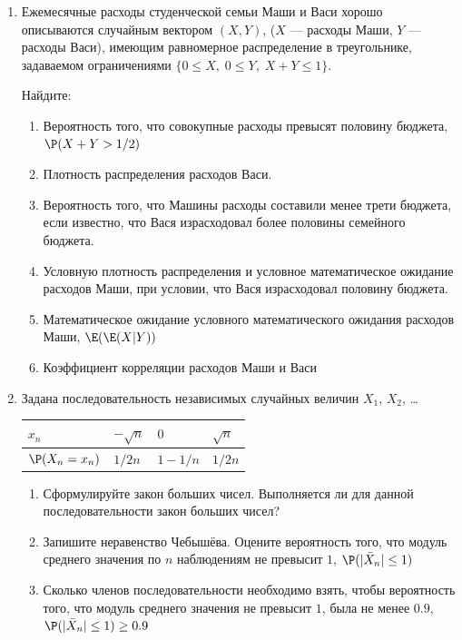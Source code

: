 \begin{enumerate}
\item Ежемесячные расходы студенческой семьи Маши и Васи хорошо описываются случайным
вектором $(X,Y)$, ($X$ — расходы Маши, $Y$ — расходы Васи), имеющим равномерное
распределение в треугольнике, задаваемом ограничениями $\{0 \leq X, \; 0\leq Y, \; X+Y \leq 1 \}$.

Найдите:

\begin{enumerate}
\item Вероятность того, что совокупные расходы превысят половину бюджета, $\P(X+Y>1/2)$
\item Плотность распределения расходов Васи.
\item Вероятность того, что Машины расходы составили менее трети бюджета, если
известно, что Вася израсходовал более половины семейного бюджета.
\item Условную плотность распределения и условное математическое ожидание расходов Маши, при условии, что Вася израсходовал половину бюджета.
\item Математическое ожидание условного математического ожидания расходов Маши, $\E(\E(X|Y))$
\item Коэффициент корреляции расходов Маши и Васи
\end{enumerate}

\item Задана последовательность независимых случайных величин $X_1$, $X_2$, \ldots

\begin{tabular}{llll}
\toprule
$x_n$ & $-\sqrt{n}$ & $0$ & $\sqrt{n}$ \\ \midrule
$\P(X_n = x_n)$ & $1/2n$ & $1-1/n$ & $1/2n$ \\
\bottomrule
\end{tabular}

\begin{enumerate}
\item Сформулируйте закон больших чисел. Выполняется ли для данной последовательности
закон больших чисел?
\item Запишите неравенство Чебышёва. Оцените вероятность того, что модуль среднего
значения по $n$ наблюдениям не превысит $1$, $\P(|\bar X_n| \leq 1)$
\item Сколько членов последовательности необходимо взять, чтобы вероятность того, что
модуль среднего значения не превысит $1$, была не менее $0.9$, $\P(|\bar X_n| \leq 1)\geq 0.9$
\end{enumerate}


\end{enumerate}
